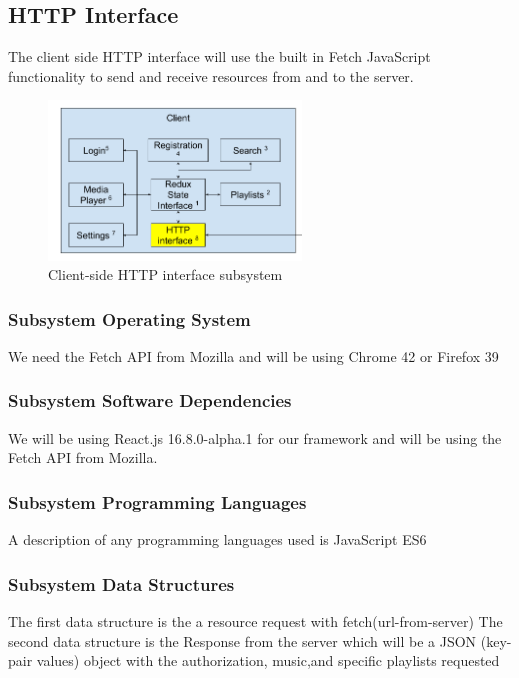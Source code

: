 \subsection{HTTP Interface}
The client side HTTP interface will use the built in Fetch JavaScript functionality to send and receive resources from and to the server.

\begin{figure}[h!]
	\centering
 	\includegraphics[width=0.60\textwidth]{images/client/client_http_interface.png}
 	\caption{Client-side HTTP interface subsystem}
\end{figure}


\subsubsection{Subsystem Operating System}
We need the Fetch API from Mozilla and will be using Chrome 42 or Firefox 39

\subsubsection{Subsystem Software Dependencies}
We will be using React.js 16.8.0-alpha.1 for our framework and will be using the Fetch API from Mozilla.

\subsubsection{Subsystem Programming Languages}
A description of any programming languages used is JavaScript ES6

\subsubsection{Subsystem Data Structures}
The first data structure is the a resource request with fetch(url-from-server)
The second data structure is the Response from the server which will be a JSON (key-pair values) object with the authorization, music,and specific playlists requested



\newpage